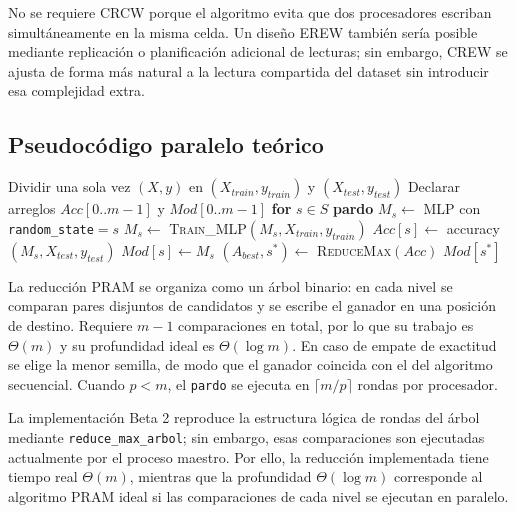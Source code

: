 \documentclass[11pt,a4paper]{article}
\begin{document}
No se requiere CRCW porque el algoritmo evita que dos procesadores escriban
simultáneamente en la misma celda. Un diseño EREW también sería posible mediante
replicación o planificación adicional de lecturas; sin embargo, CREW se ajusta de forma
más natural a la lectura compartida del dataset sin introducir esa complejidad extra.

\subsection{Pseudocódigo paralelo teórico}

\begin{algorithm}[H]
\caption{Entrenamiento paralelo CREW-PRAM de múltiples MLP}
Dividir una sola vez $(X,y)$ en $(X_{train},y_{train})$ y $(X_{test},y_{test})$ 
Declarar arreglos $Acc[0..m-1]$ y $Mod[0..m-1]$ 
\textbf{for} $s \in S$ \textbf{pardo} 
\Indp
  $M_s \leftarrow$ MLP con \texttt{random\_state}$=s$ 
  $M_s \leftarrow$ \textsc{Train\_MLP}$(M_s, X_{train}, y_{train})$ 
  $Acc[s] \leftarrow$ accuracy$(M_s, X_{test}, y_{test})$ 
  $Mod[s] \leftarrow M_s$ 
\Indm
$(A_{best}, s^*) \leftarrow$ \textsc{ReduceMax}$(Acc)$ 
\Return $Mod[s^*]$
\end{algorithm}

La reducción PRAM se organiza como un árbol binario: en cada nivel se comparan pares
disjuntos de candidatos y se escribe el ganador en una posición de destino. Requiere
$m-1$ comparaciones en total, por lo que su trabajo es $\Theta(m)$ y su profundidad
ideal es $\Theta(\log m)$. En caso de empate de exactitud se elige la menor semilla,
de modo que el ganador coincida con el del algoritmo secuencial. Cuando $p<m$, el
\texttt{pardo} se ejecuta en $\lceil m/p\rceil$ rondas por procesador.

La implementación Beta 2 reproduce la estructura lógica de rondas del árbol mediante
\texttt{reduce\_max\_arbol}; sin embargo, esas comparaciones son ejecutadas actualmente
por el proceso maestro. Por ello, la reducción implementada tiene tiempo real
$\Theta(m)$, mientras que la profundidad $\Theta(\log m)$ corresponde al algoritmo
PRAM ideal si las comparaciones de cada nivel se ejecutan en paralelo.
\end{document}
